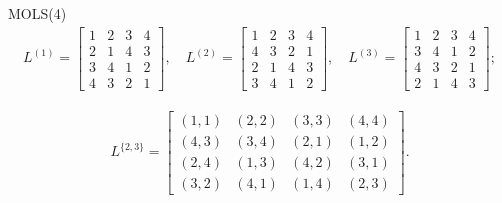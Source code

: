 \documentclass{beamer}
\begin{document}
\begin{frame}{MOLS(4)}
\[
\begin{aligned}
    L^{(1)} = \begin{bmatrix}
        1 & 2 & 3 & 4\\
        2 & 1 & 4 & 3\\
        3 & 4 & 1 & 2\\
        4 & 3 & 2 & 1
    \end{bmatrix},\quad 
    L^{(2)} = \begin{bmatrix}
        1 & 2 & 3 & 4\\
        4 & 3 & 2 & 1\\
        2 & 1 & 4 & 3\\
        3 & 4 & 1 & 2
    \end{bmatrix},\quad
    L^{(3)} = \begin{bmatrix}
        1&2&3&4\\
        3&4&1&2\\
        4&3&2&1\\
        2&1&4&3
    \end{bmatrix};
\end{aligned}
\]

\[
\begin{aligned}
    L^{\{2,3\}} =
    \begin{bmatrix}
        (1,1) & (2,2) & (3,3) & (4,4)\\
        (4,3) & (3,4) & (2,1) & (1,2)\\
        (2,4) & (1,3) & (4,2) & (3,1)\\
        (3,2) & (4,1) & (1,4) & (2,3)
    \end{bmatrix}.
\end{aligned}
\]
\end{frame}

\end{document}
